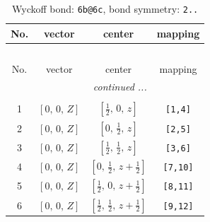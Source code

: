 \documentclass[fleqn,8pt]{jsarticle}
\begin{document}
\begin{longtable}{cccc}
\caption{Wyckoff bond: {\tt 6b@6c}, bond symmetry: {\tt 2..}}
 \\
 \hline \hline
No. & vector & center & mapping \\ \hline \endfirsthead

\multicolumn{3}{l}{\tablename\ \thetable{}} \\
 \hline \hline
No. & vector & center & mapping \\ \hline \endhead

 \hline \hline
\multicolumn{3}{r}{\footnotesize\it continued ...} \\ \endfoot

 \hline \hline
\multicolumn{3}{r}{} \\ \endlastfoot

1 & $\left[ 0,\, 0,\, Z \right]$ & $\left[ \frac{1}{2},\, 0,\, z \right]$ & {\tt [1,4]} \\ \hline
2 & $\left[ 0,\, 0,\, Z \right]$ & $\left[ 0,\, \frac{1}{2},\, z \right]$ & {\tt [2,5]} \\ \hline
3 & $\left[ 0,\, 0,\, Z \right]$ & $\left[ \frac{1}{2},\, \frac{1}{2},\, z \right]$ & {\tt [3,6]} \\ \hline
4 & $\left[ 0,\, 0,\, Z \right]$ & $\left[ 0,\, \frac{1}{2},\, z + \frac{1}{2} \right]$ & {\tt [7,10]} \\ \hline
5 & $\left[ 0,\, 0,\, Z \right]$ & $\left[ \frac{1}{2},\, 0,\, z + \frac{1}{2} \right]$ & {\tt [8,11]} \\ \hline
6 & $\left[ 0,\, 0,\, Z \right]$ & $\left[ \frac{1}{2},\, \frac{1}{2},\, z + \frac{1}{2} \right]$ & {\tt [9,12]} \\
\end{longtable}
\renewcommand{\arraystretch}{1.2}
\end{document}
